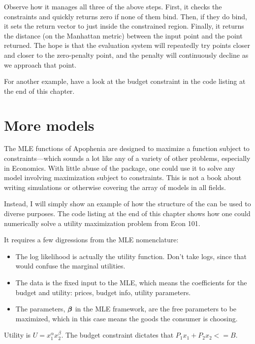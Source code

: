 Observe how it manages all three of the above steps. First, it checks
the constraints and quickly returns zero if none of them bind. Then, if
they do bind, it sets the return vector to just inside the constrained
region. Finally, it returns the distance (on the Manhattan metric)
between the input point and the point returned. The hope is that the
evaluation system will repeatedly try points closer and closer to the
zero-penalty point, and the penalty will continuously decline as we
approach that point.

For another example, have a look at the budget constraint in the code
listing at the end of this chapter.

\section{More models}    \label{econ101}

The MLE functions of Apophenia are designed to maximize a function
subject to constraints---which sounds a lot like any of a variety of
other problems, especially in Economics. With little abuse of the package,
one could use it to solve any model involving maximization
subject to constraints.  This is not a book about writing simulations
or otherwise covering the array of models in all fields.

Instead, I will simply show an example of how the structure of the
 can be used to diverse purposes.
The code listing at the end of this
chapter shows how one could numerically solve a utility maximization
problem from Econ 101. 

It requires a few digressions from the MLE nomenclature:
\begin{itemize}
\item The log likelihood is actually the utility function. Don't take logs,
since that would confuse the marginal utilities.

\item The data is the fixed input to the MLE, which means the
coefficients for the budget and utility:
prices, budget info, utility parameters.

\item The parameters, ${\mbox{\boldmath$\beta$}}$ in the MLE framework, are the free
parameters to be maximized, which in this case means the goods the
consumer is choosing.  \end{itemize}

Utility is $U = x_1^\alpha x_2^\beta$. 
The budget constraint dictates that $P_1 x_1 + P_2 x_2 <= B$.
                                                             
